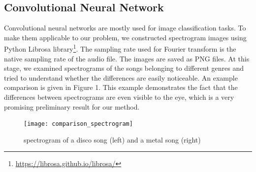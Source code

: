 \documentclass[acmtog, authorversion]{acmart}
\begin{document}
\subsection{Convolutional Neural Network}
Convolutional neural networks are mostly used for image classification tasks. To make them applicable to our problem, we constructed spectrogram images using
Python Librosa library\footnote{\url{https://librosa.github.io/librosa/}}. The sampling rate used for Fourier transform is the native sampling rate of the 
audio file. The images are saved as PNG files. At this stage, we examined spectrograms of the songs belonging to different genres and tried to understand 
whether the differences are easily noticeable. An example comparison is given in Figure 1. This example demonstrates the fact that the differences between spectrograms are even visible to the eye, which is a very promising preliminary result for 
our method.\\
\begin{figure}[h!]
  \centering
  \texttt{[image: comparison\_spectrogram]}
  \caption{spectrogram of a disco song (left) and a metal song (right)}
  \end{figure}
\end{document}
